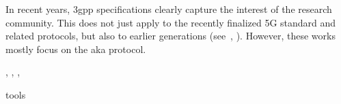 In recent years, \gls{3gpp} specifications clearly capture the interest of the research community.
This does not just apply to the recently finalized 5G standard and related protocols, but also to earlier generations (see~\cite{alt2016cryptographic}, \cite{lee2014anonymity}).
However, these works mostly focus on the \gls{aka} protocol.

\cite{basin2018formal}, \cite{dehnel2018security}, \cite{borgaonkar2019new}, \cite{lanzenberger2017formal}

\cite{o2017mobile}

tools
\cite{cremers2008scyther} \cite{scyther}
\cite{meier2013tamarin} \cite{tamarin}
\cite{blanchet2016modeling} \cite{proverif}